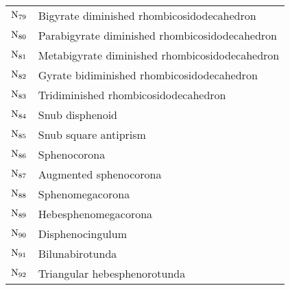 \begin{table}[htbp]
\begin{center}
\begin{tabular}{l|l}
$\mbox{N$_{79}$}$ & Bi\-gyrate diminished rhom\-bi\-cosi\-dodeca\-hedron \\
$\mbox{N$_{80}$}$ & Para\-bi\-gyrate diminished rhom\-bi\-cosi\-dodeca\-hedron \\
$\mbox{N$_{81}$}$ & Meta\-bi\-gyrate diminished rhom\-bi\-cosi\-dodeca\-hedron \\
$\mbox{N$_{82}$}$ & Gyrate bi\-diminished rhom\-bi\-cosi\-dodeca\-hedron \\
$\mbox{N$_{83}$}$ & Tri\-diminished rhom\-bi\-cosi\-dodeca\-hedron \\
$\mbox{N$_{84}$}$ & Snub disphenoid \\
$\mbox{N$_{85}$}$ & Snub square antiprism \\
$\mbox{N$_{86}$}$ & Spheno\-corona \\
$\mbox{N$_{87}$}$ & Augmented spheno\-corona \\
$\mbox{N$_{88}$}$ & Spheno\-mega\-corona \\
$\mbox{N$_{89}$}$ & Hebe\-spheno\-mega\-corona \\
$\mbox{N$_{90}$}$ & Di\-spheno\-cingulum \\
$\mbox{N$_{91}$}$ & Bi\-luna\-bi\-rotunda \\
$\mbox{N$_{92}$}$ & Triangular hebe\-spheno\-rotunda \\
\hline
\end{tabular}
\end{center}
\end{table}


